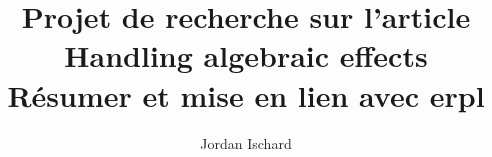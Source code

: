 \usepackage[utf8]{inputenc}
\usepackage{version}

\usepackage{amssymb,amsmath,amsthm}
\usepackage{graphicx}
\usepackage{enumerate}
\usepackage{tikz}
\usetikzlibrary{matrix,arrows}
\usepackage{todonotes}
\usepackage{fullpage}
\usepackage[french,linesnumbered,lined,boxed,commentsnumbered,ruled,vlined]{algorithm2e}

\renewcommand{\contentsname}{Table des matières}   


%
%

\usepackage{tikz}
\usetikzlibrary{positioning}
\usetikzlibrary{calc}

\usepackage[affil-it]{authblk}

\renewcommand*{\Authsep}{, }
\renewcommand*{\Authand}{, }
\renewcommand*{\Authands}{, }

\title{Projet de recherche sur l'article \textbf{Handling algebraic effects}\\
Résumer et mise en lien avec \textbf{erpl}}

\author[1]{Jordan Ischard}


\date{}

\newtheorem{theorem}{Théorème}
\newtheorem{lemma}{Lemme}
\newtheorem{corollary}[theorem]{Corollaire}
\newtheorem{claim}[theorem]{Claim}
\newtheorem{proposition}[theorem]{Proposition}
\newtheorem{definition}{Définition}
\theoremstyle{definition}
\newtheorem*{remark}{Remarque}
\newtheorem{exemple}{Exemple}

\newenvironment{proofclaim}{
	\noindent \emph{Proof.}
}{%
	\hfill $\diamond$ \\
}

\newcommand{\probleme}[4]{

    \vspace{0.4cm}
    \fbox{
        \begin{minipage}{0.95 \linewidth}
            \centerline{\textsc{\underline{#1}}}
            \textbf{Entr\'ee} : #2 \\ \textbf{#4} : #3
        \end{minipage}
    }
    \vspace{0.4cm}

}

\newcommand{\RMV}{\todo[inline]{Paragraphe à supprimer}}
\renewcommand*{\proofname}{Preuve}
